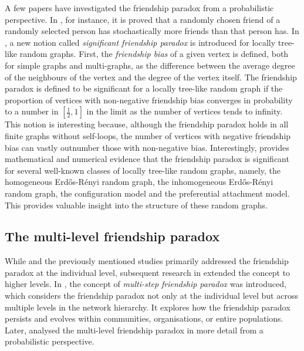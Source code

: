\documentclass[11pt]{article}
\numberwithin{equation}{section}
\theoremstyle{plain}
\begin{document}
A few papers have investigated the friendship paradox from a probabilistic perspective. In \cite{CR}, for instance, it is proved that a randomly chosen friend of a randomly selected person has stochastically more friends than that person has. In \cite{HHP}, a new notion called \emph{significant friendship paradox} is introduced for locally tree-like random graphs. First, the \emph{friendship bias} of a given vertex is defined, both for simple graphs and multi-graphs, as the difference between the average degree of the neighbours of the vertex and the degree of the vertex itself. The friendship paradox is defined to be significant for a locally tree-like random graph if the proportion of vertices with non-negative friendship bias converges in probability to a number in $[\tfrac12,1]$ in the limit as the number of vertices tends to infinity. This notion is interesting because, although the friendship paradox holds in all finite graphs without self-loops, the number of vertices with negative friendship bias can vastly outnumber those with non-negative bias. Interestingly, \cite{HHP} provides mathematical and numerical evidence that the friendship paradox is significant for several well-known classes of locally tree-like random graphs, namely, the homogeneous Erd\H{o}s-R\'enyi random graph, the inhomogeneous Erd\H{o}s-R\'enyi random graph, the configuration model and the preferential attachment model. This provides valuable insight into the structure of these random graphs.


\subsection{The multi-level friendship paradox}

While \cite{SF} and the previously mentioned studies primarily addressed the friendship paradox at the individual level, subsequent research in \cite{KCR} extended the concept to higher levels. In \cite{KCR}, the concept of \emph{multi-step friendship paradox} was introduced, which considers the friendship paradox not only at the individual level but across multiple levels in the network hierarchy. It explores how the friendship paradox persists and evolves within communities, organisations, or entire populations. Later, \cite{BZ} analysed the multi-level friendship paradox in more detail from a probabilistic perspective. 
\end{document}
